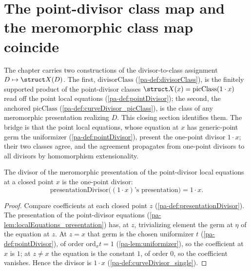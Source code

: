 \section{The point-divisor class map and the meromorphic class map coincide}

The chapter carries two constructions of the divisor-to-class assignment \(D \mapsto \struct
X(D)\). The first, \(\mathrm{divisorClass}\) (\ref{pa-def:divisorClass}), is the finitely supported
product of the point-divisor classes \(\struct X(x) = \mathrm{picClass}(1 \cdot x)\) read off the
point local equations (\ref{pa-def:pointDivisor}); the second, the anchored
\(\mathrm{picClass}\) (\ref{pa-def:curveDivisor_picClass}), is the class of any meromorphic
presentation realizing \(D\). This closing section identifies them. The bridge is that the point
local equations, whose equation at \(x\) has generic-point germ the uniformizer
(\ref{pa-def:pointDivisor}), present the one-point divisor \(1 \cdot x\); their two classes agree, and
the agreement propagates from one-point divisors to all divisors by homomorphism extensionality.

\begin{theorem}
  \label{pa-thm:presentationDivisor_pointDivisor}
  \leanok

  The divisor of the meromorphic presentation of the point-divisor local equations at a closed
  point \(x\) is the one-point divisor:
  \[
    \mathrm{presentationDivisor}\bigl((1 \cdot x)\text{'s presentation}\bigr) = 1 \cdot x .
  \]
\end{theorem}
\begin{proof}
  \leanok
  Compare coefficients at each closed point \(z\) (\ref{pa-def:presentationDivisor}). The presentation
  of the point-divisor equations (\ref{pa-lem:localEquations_presentation}) has, at \(z\), trivializing
  element the germ at \(\eta\) of the equation at \(z\). At \(z = x\) that germ is the chosen
  uniformizer \(t\) (\ref{pa-def:pointDivisor}), of order \(\mathrm{ord}_x t = 1\)
  (\ref{pa-lem:uniformizer}), so the coefficient at \(x\) is \(1\); at \(z \neq x\) the equation is the
  constant \(1\), of order \(0\), so the coefficient vanishes. Hence the divisor is \(1 \cdot x\)
  (\ref{pa-def:curveDivisor_single}).
\end{proof}


